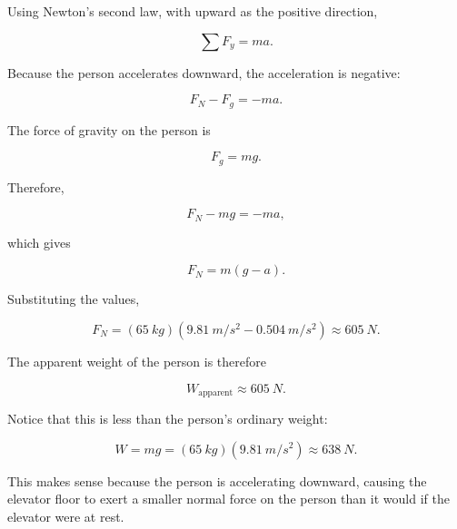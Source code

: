 \begin{mdframed}[backgroundcolor=blue!10!white]
\begin{center}
			\end{center}
			
			Using Newton's second law, with upward as the positive direction,
			
			\begin{equation*}
				\sum F_y = ma.
			\end{equation*}
			
			Because the person accelerates downward, the acceleration is negative:
			
			\begin{equation*}
				F_N-F_g=-ma.
			\end{equation*}
			
			The force of gravity on the person is
			
			\begin{equation*}
				F_g = mg.
			\end{equation*}
			
			Therefore,
			
			\begin{equation*}
				F_N-mg=-ma,
			\end{equation*}
			
			which gives
			
			\begin{equation*}
				F_N=m(g-a).
			\end{equation*}
			
			Substituting the values,
			
			\begin{equation*}
				F_N =
				(\SI{65}{kg})
				\left(\SI{9.81}{m/s^2}-\SI{0.504}{m/s^2}\right)
				\approx \SI{605}{N}.
			\end{equation*}
			
			The apparent weight of the person is therefore
			
			\begin{equation*}
				\boxed{W_{\text{apparent}} \approx \SI{605}{N}}.
			\end{equation*}
			
			Notice that this is less than the person's ordinary weight:
			
			\begin{equation*}
				W=mg=(\SI{65}{kg})(\SI{9.81}{m/s^2})
				\approx \SI{638}{N}.
			\end{equation*}
			
			This makes sense because the person is accelerating downward, causing the elevator floor to exert a smaller normal force on the person than it would if the elevator were at rest.
			
		\end{mdframed}
		
